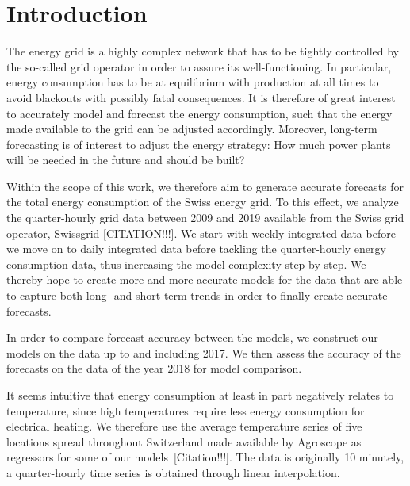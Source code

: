 \documentclass[conference]{IEEEtran}
\begin{document}
\section{Introduction}
The energy grid is a highly complex network that has to be tightly controlled by the so-called grid operator in order to assure its well-functioning. In particular, energy consumption has to be at equilibrium with production at all times to avoid blackouts with possibly fatal consequences. It is therefore of great interest to accurately model and forecast the energy consumption, such that the energy made available to the grid can be adjusted accordingly. Moreover, long-term forecasting is of interest to adjust the energy strategy: How much power plants will be needed in the future and should be built? 
\par
Within the scope of this work, we therefore aim to generate accurate forecasts for the total energy consumption of the Swiss energy grid. To this effect, we analyze the quarter-hourly grid data between 2009 and 2019 available from the Swiss grid operator, Swissgrid [CITATION!!!]. We start with weekly integrated data before we move on to daily integrated data before tackling the quarter-hourly energy consumption data, thus increasing the model complexity step by step. We thereby hope to create more and more accurate models for the data that are able to capture both long- and short term trends in order to finally create accurate forecasts.
\par
In order to compare forecast accuracy between the models, we construct our models on the data up to and including 2017. We then assess the accuracy of the forecasts on the data of the year 2018 for model comparison. 
\par
It seems intuitive that energy consumption at least in part negatively relates to temperature, since high temperatures require less energy consumption for electrical heating. We therefore use the average temperature series of five locations spread throughout Switzerland made available by Agroscope as regressors for some of our models [Citation!!!]. The data is originally 10 minutely, a quarter-hourly time series is obtained through linear interpolation.  
\end{document}

